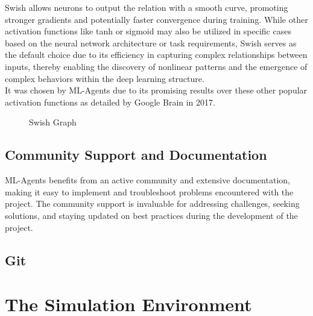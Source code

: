 \documentclass{article}
\begin{document}
Swish allows neurons to output the relation with a smooth curve, promoting stronger gradients and potentially faster convergence during training. While other activation functions like tanh or sigmoid may also be utilized in specific cases based on the neural network architecture or task requirements, Swish serves as the default choice due to its efficiency in capturing complex relationships between inputs, thereby enabling the discovery of nonlinear patterns and the emergence of complex behaviors within the deep learning structure.\\

It was chosen by ML-Agents due to its promising results over these other popular activation functions as detailed by Google Brain in 2017.

\begin{figure}[h]
    \centering
    \caption{Swish Graph}
\end{figure}


\subsection{Community Support and Documentation}
ML-Agents benefits from an active community and extensive documentation, making it easy to implement and troubleshoot problems encountered with the project. The community support is invaluable for addressing challenges, seeking solutions, and staying updated on best practices during the development of the project.

\subsection{Git}
\lipsum[2][1]

\section{The Simulation Environment}
\lipsum[2][1]
\end{document}
